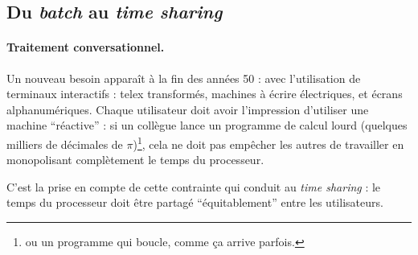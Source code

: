 \subsection{Du \emph{batch} au \emph{time sharing}}


\paragraph{Traitement conversationnel.}  Un
nouveau besoin apparaît à la fin des années 50 : avec l'utilisation de
terminaux interactifs : telex transformés, machines à écrire
électriques, et écrans alphanumériques.  Chaque utilisateur doit avoir
l'impression d'utiliser une machine ``réactive'' : si un collègue
lance un programme de calcul lourd (quelques milliers de décimales de
$\pi$)\footnote{ou un programme qui boucle, comme ça arrive parfois.},
cela ne doit pas empêcher les autres de travailler en monopolisant
complètement le temps du processeur.


C'est la prise en compte de cette contrainte qui conduit au \emph{time
  sharing} : le temps du processeur doit être partagé ``équitablement''
entre les utilisateurs.


